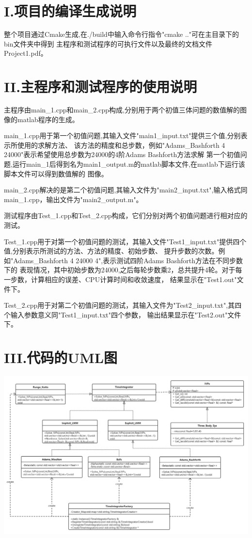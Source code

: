 \documentclass[twoside,a4paper]{article}
\begin{document}
\pagestyle{fancy}
\fancyhead{}

\section*{I.项目的编译生成说明}
\hspace{0.8em}
整个项目通过Cmake生成,在./build中输入命令行指令"cmake .."可在主目录下的bin文件夹中得到
主程序和测试程序的可执行文件以及最终的文档文件Project1.pdf。

\section*{II.主程序和测试程序的使用说明}
\hspace{0.8em}
主程序由main\_1.cpp和main\_2.cpp构成,分别用于两个初值三体问题的数值解的图像的matlab程序的生成。

main\_1.cpp用于第一个初值问题,其输入文件"main1\_input.txt"提供三个值,分别表示所使用的求解方法、
该方法的精度和总步数，例如"Adams\_Bashforth 4 24000"表示希望使用总步数为24000的4阶Adams Bashforth方法求解
第一个初值问题,运行main\_1后得到名为main1\_output.m的matlab脚本文件,在matlab下运行该脚本文件可以得到数值解的
图像。

main\_2.cpp解决的是第二个初值问题,其输入文件为"main2\_input.txt",输入格式同main\_1.cpp，输出文件为"main2\_output.m"。

测试程序由Test\_1.cpp和Test\_2.cpp构成，它们分别对两个初值问题进行相对应的测试。

Test\_1.cpp用于对第一个初值问题的测试，其输入文件"Test1\_input.txt"提供四个值,分别表示所测试的方法、方法的精度、初始步数、
提升步数的次数。例如"Adams\_Bashforth 4 24000 4",表示测试四阶Adams Bashforth方法在不同步数下的
表现情况，其中初始步数为24000,之后每轮步数乘2，总共提升4轮。对于每一步数，计算相应的误差、CPU计算时间和收敛速度，
结果显示在"Test1.out"文件下。

Test\_2.cpp用于对第二个初值问题的测试，其输入文件为"Test2\_input.txt",其四个输入参数意义同"Test1\_input.txt"四个参数，
输出结果显示在"Test2.out"文件下。

\section*{III.代码的UML图}
\includegraphics[scale=0.36]{../png/uml.png}
\end{document}
